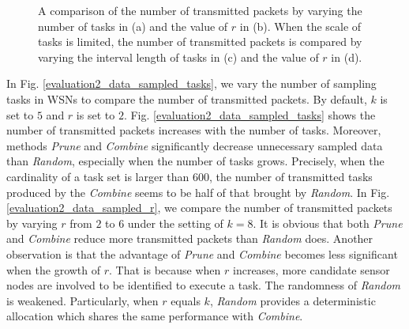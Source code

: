 \documentclass[prodmode,acmtosn]{acmsmall}
\begin{document}
\begin{figure}[!t]
\caption{A comparison of the number of transmitted packets by varying the number of tasks in (a) and the value of $r$ in (b). When the scale of tasks is limited, the number of transmitted packets is compared by varying the interval length of tasks in (c) and the value of $r$ in (d).}
\label{evaluation2}
\end{figure}




In Fig. \ref{evaluation2_data_sampled_tasks}, we vary the number of sampling tasks in WSNs to compare the number of transmitted packets. By default, $k$ is set to $5$ and $r$ is set to $2$.  Fig. \ref{evaluation2_data_sampled_tasks} shows  the number of transmitted packets increases with the number of tasks. Moreover, methods \emph{Prune} and \emph{Combine} significantly decrease unnecessary sampled data than \emph{Random}, especially when the number of tasks grows. Precisely, when the cardinality of a task set is larger than $600$, the number of transmitted tasks produced by the \emph{Combine} seems to be half of that brought by \emph{Random}. In Fig. \ref{evaluation2_data_sampled_r}, we compare the number of transmitted packets by varying $r$ from $2$ to $6$ under the setting of  $k\mathrm{=}8$. It is obvious that both \emph{Prune} and \emph{Combine} reduce more transmitted packets than \emph{Random} does. Another observation is that the advantage of \emph{Prune} and \emph{Combine} becomes less significant when the growth of $r$. That is because when $r$ increases, more candidate sensor nodes are involved to be identified to execute a task. The randomness of \emph{Random} is weakened. Particularly, when $r$ equals $k$, \emph{Random} provides a deterministic allocation which shares the same performance with \emph{Combine}.
\end{document}
